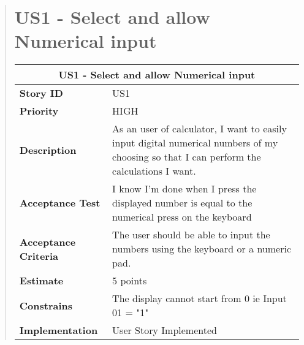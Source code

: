 \documentclass[12pt]{report}
\begin{document}
\begin{quote}
                \section{US1 - Select and allow Numerical input}
                
                \begin{tabular}{ |p{4cm}|p{10cm}| }
                 \hline
                 \multicolumn{2}{|c|}{\textbf{US1 - Select and allow Numerical input}} \\
                 \hline
                 \textbf {Story ID}& US1  \\
                 \hline
                 \textbf{Priority} & HIGH \\
                 \hline
                 \textbf{Description}   & As an user of calculator, I want to easily input digital numerical numbers of my choosing so that I can perform the calculations I want.  \\
                 \hline
                 \textbf{Acceptance Test}&I know I'm done when I press the displayed number is equal to the numerical press on the keyboard\\
                   \hline
                 \textbf{Acceptance Criteria}& The user should be able to input the numbers using the keyboard or a numeric pad.\\
                 \hline
                 \textbf{Estimate} & 5  points  \\
                 \hline
                 \textbf{Constrains}& The display cannot start from 0 ie Input 01 = "1"  \\
                \hline
                 \textbf {Implementation}&User Story Implemented \\
                \hline
                \end{tabular}
      
                
        
        
        
        

\end{quote}
\end{document}
